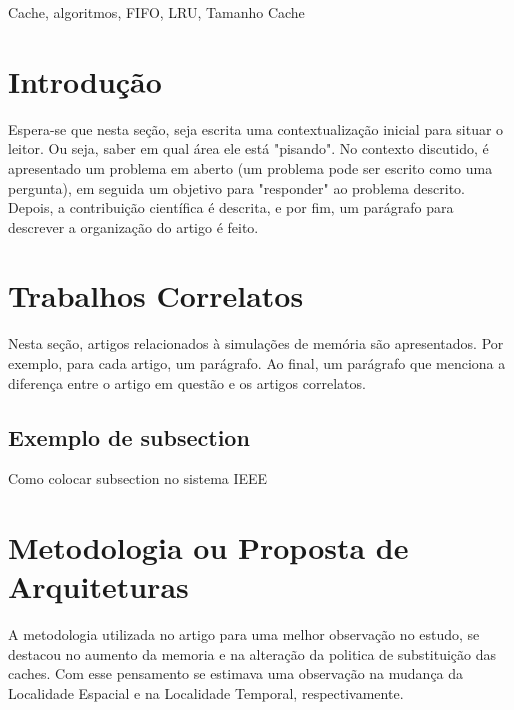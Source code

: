 \documentclass[conference]{IEEEtran}
\begin{document}
\begin{IEEEkeywords}
Cache, algoritmos, FIFO, LRU, Tamanho Cache
\end{IEEEkeywords}

\section{Introdução}

Espera-se que nesta seção, seja escrita uma contextualização inicial 
para situar o leitor. Ou seja, saber em qual área ele está "pisando".
No contexto discutido, é apresentado um problema em aberto (um problema 
pode ser escrito como uma pergunta), em seguida um objetivo para "responder" 
ao problema descrito. Depois, a contribuição científica é descrita, e por fim, 
um parágrafo para descrever a organização do artigo é feito.

\section{Trabalhos Correlatos}

Nesta seção, artigos relacionados à simulações de memória são apresentados.
Por exemplo, para cada artigo, um parágrafo. Ao final, um parágrafo que menciona
a diferença entre o artigo em questão e os artigos correlatos.

\subsection{Exemplo de subsection}

Como colocar subsection no sistema IEEE

\section{Metodologia ou Proposta de Arquiteturas}


A metodologia utilizada no artigo para uma melhor observação no estudo, se destacou no aumento da memoria e na 
alteração da politica de substituição das caches. Com esse pensamento se estimava uma observação na mudança da 
Localidade Espacial e na Localidade Temporal, respectivamente.  
\end{document}
